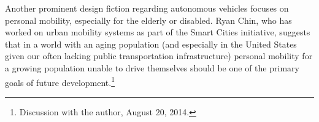 

Another prominent design fiction regarding autonomous vehicles focuses
on personal mobility, especially for the elderly or disabled. Ryan
Chin, who has worked on urban mobility systems as part of the Smart Cities
initiative, suggests that in a world with an aging population (and
especially in the United States given our often lacking public
transportation infrastructure) personal mobility for a growing
population unable to drive themselves should be one of the primary
goals of future development.\footnote{Discussion with the author,
  August 20, 2014.} %



